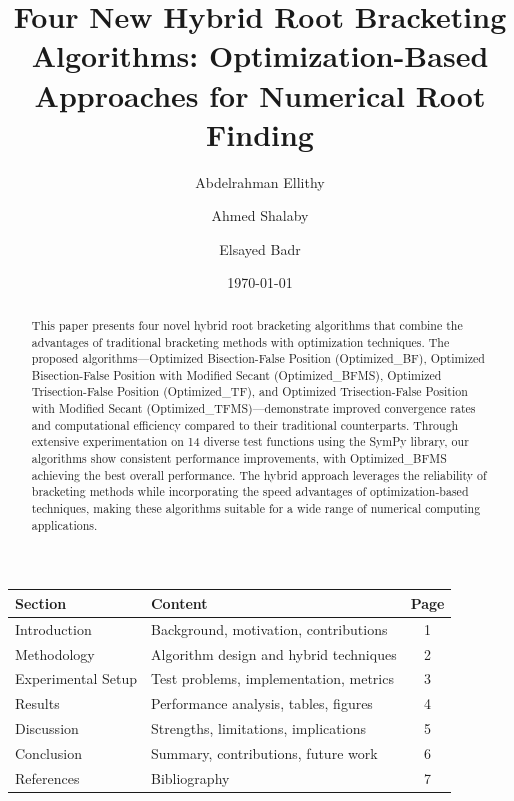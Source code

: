 \documentclass[reprint, amsmath, amssymb, aps, prl]{revtex4-2}
\begin{document}
\pagestyle{plain}


\title{Four New Hybrid Root Bracketing Algorithms: Optimization-Based Approaches for Numerical Root Finding}

\author{Abdelrahman Ellithy}

\author{Ahmed Shalaby}

\author{Elsayed Badr}

\date{\today}

\begin{abstract}
This paper presents four novel hybrid root bracketing algorithms that combine the advantages of traditional bracketing methods with optimization techniques. The proposed algorithms—Optimized Bisection-False Position (Optimized\_BF), Optimized Bisection-False Position with Modified Secant (Optimized\_BFMS), Optimized Trisection-False Position (Optimized\_TF), and Optimized Trisection-False Position with Modified Secant (Optimized\_TFMS)—demonstrate improved convergence rates and computational efficiency compared to their traditional counterparts. Through extensive experimentation on 14 diverse test functions using the SymPy library, our algorithms show consistent performance improvements, with Optimized\_BFMS achieving the best overall performance. The hybrid approach leverages the reliability of bracketing methods while incorporating the speed advantages of optimization-based techniques, making these algorithms suitable for a wide range of numerical computing applications.
\end{abstract}

\begin{center}
\begin{tabular}{|l|l|c|}
\hline
\textbf{Section} & \textbf{Content} & \textbf{Page} \\
\hline
Introduction & Background, motivation, contributions & 1 \\
Methodology & Algorithm design and hybrid techniques & 2 \\
Experimental Setup & Test problems, implementation, metrics & 3 \\
Results & Performance analysis, tables, figures & 4 \\
Discussion & Strengths, limitations, implications & 5 \\
Conclusion & Summary, contributions, future work & 6 \\
References & Bibliography & 7 \\
\hline
\end{tabular}
\end{center}
\end{document}
